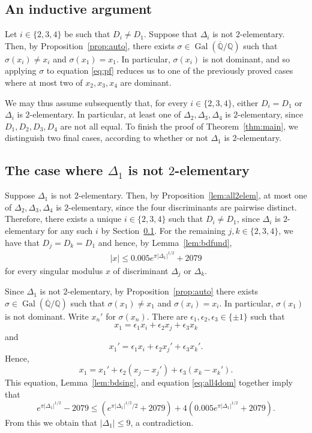 \documentclass[12pt,a4paper,oneside]{amsart}
\DeclareMathOperator{\gal}{Gal}
\begin{document}
	\subsection{An inductive argument}\label{subsec:ind}
	
	Let $i \in \{2, 3, 4\}$ be such that $D_i \neq D_1$. Suppose that $\Delta_i$ is not $2$-elementary. Then, by Proposition~\ref{prop:auto}, there exists $\sigma \in \gal(\overline{\mathbb Q} / \mathbb Q )$ such that $\sigma(x_i) \neq x_i$ and $\sigma(x_1) = x_1$. In particular, $\sigma(x_i)$ is not dominant, and so applying $\sigma$ to equation \eqref{eq:pf} reduces us to one of the previously proved cases where at most two of $x_2, x_3, x_4$ are dominant. 
    
    We may thus assume subsequently that, for every $i \in \{ 2, 3, 4\}$, either $D_i = D_1$ or $\Delta_i$ is $2$-elementary. In particular, at least one of $\Delta_2, \Delta_3, \Delta_4$ is $2$-elementary, since $D_1, D_2, D_3, D_4$ are not all equal. 
    To finish the proof of Theorem~\ref{thm:main}, we distinguish two final cases, according to whether or not $\Delta_1$ is $2$-elementary.
	
	\subsection{The case where \texorpdfstring{$\Delta_1$}{Delta 1} is not \texorpdfstring{$2$}{2}-elementary}
	
	 Suppose $\Delta_1$ is not $2$-elementary. Then, by Proposition~\ref{lem:all2elem}, at most one of $\Delta_2, \Delta_3, \Delta_4$ is $2$-elementary, since the four discriminants are pairwise distinct. Therefore, there exists a unique $i \in \{2, 3, 4\}$ such that $D_i \neq D_1$, since $\Delta_i$ is $2$-elementary for any such $i$ by Section~\ref{subsec:ind}. For the remaining $j, k \in \{2, 3, 4\}$, we have that $D_j = D_k = D_1$ and hence, by Lemma~\ref{lem:bdfund},
	\begin{align}\label{eq:all4dom}
	\lvert x \rvert \leq 0.005 e^{\pi \lvert \Delta_1 \rvert^{1/2}} + 2079
	\end{align}
	for every singular modulus $x$ of discriminant $\Delta_j$ or $\Delta_k$.
	
	Since $\Delta_1$ is not $2$-elementary, by Proposition~\ref{prop:auto} there exists $\sigma \in \gal(\overline{\mathbb Q}/\mathbb{Q})$ such that $\sigma(x_1) \neq x_1$ and $\sigma(x_i) = x_i$. In particular, $\sigma(x_1)$ is not dominant. Write $x_n'$ for $\sigma(x_n)$. There are $\epsilon_1, \epsilon_2, \epsilon_3 \in \{\pm 1\}$ such that
	\[ x_1 = \epsilon_1 x_i + \epsilon_2 x_j + \epsilon_3 x_k\]
	and
	\[ x_1' = \epsilon_1 x_i + \epsilon_2 x_j' + \epsilon_3 x_k'.\]
	Hence,
	\[ x_1 =  x_1' + \epsilon_2 (x_j - x_j') + \epsilon_3 (x_k - x_k').\]
	This equation,  Lemma~\ref{lem:bdsing}, and equation \eqref{eq:all4dom} together imply that
	\[ e^{\pi \lvert \Delta_1 \rvert^{1/2}} - 2079 \leq (e^{\pi \lvert \Delta_1 \rvert^{1/2}/2} + 2079) + 4 (0.005 e^{\pi \lvert \Delta_1 \rvert^{1/2}} + 2079).\]
	From this we obtain that $\lvert \Delta_1 \rvert \leq 9$, a contradiction.
	 
\end{document}
